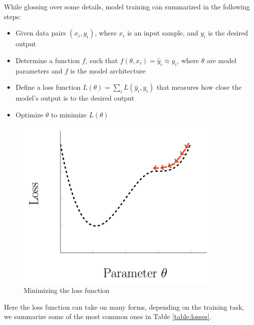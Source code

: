 While glossing over some details, model training can summarized in the following steps:
\begin{itemize}
    \item Given data pairs $(x_i, y_i)$, where $x_i$ is an input sample, and $y_i$ is the desired output
    \item Determine a function $f$, such that $f(\theta, x_i) = \hat{y}_i \approx y_i$, where $\theta$ are model parameters and $f$ is the model architecture
    \item Define a loss function $L(\theta) = \sum_i L(\hat{y}_i, y_i)$ that measures how close the model's output is to the desired output
    \item Optimize $\theta$ to minimize $L(\theta)$
\end{itemize}
\begin{figure}[h]
    \includegraphics[width=\linewidth]{chapters/NLP/figures/loss.png}
    \caption{Minimizing the loss function}
    \label{fig:loss}
\end{figure}
Here the loss function can take on many forms, depending on the training task, we summarize some of the most common ones in Table \ref{table:losses}.
